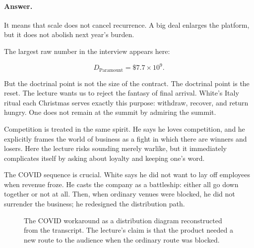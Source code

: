 \paragraph{Answer.}
It means that scale does not cancel recurrence. A big deal enlarges the platform, but it does not abolish next year's burden.

The largest raw number in the interview appears here:

\begin{equation}
D_{\mathrm{Paramount}} = \$7.7\times 10^9.
\end{equation}

But the doctrinal point is not the size of the contract. The doctrinal point is the reset. The lecture wants us to reject the fantasy of final arrival. White's Italy ritual each Christmas serves exactly this purpose: withdraw, recover, and return hungry. One does not remain at the summit by admiring the summit.

Competition is treated in the same spirit. He says he loves competition, and he explicitly frames the world of business as a fight in which there are winners and losers. Here the lecture risks sounding merely warlike, but it immediately complicates itself by asking about loyalty and keeping one's word.

The COVID sequence is crucial. White says he did not want to lay off employees when revenue froze. He casts the company as a battleship: either all go down together or not at all. Then, when ordinary venues were blocked, he did not surrender the business; he redesigned the distribution path.

\begin{figure}[h]
\centering
{}
\caption{The COVID workaround as a distribution diagram reconstructed from the transcript. The lecture's claim is that the product needed a new route to the audience when the ordinary route was blocked.}
\end{figure}

